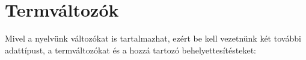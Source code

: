 \section{Termváltozók}

Mivel a nyelvünk változókat is tartalmazhat, ezért be kell vezetnünk két további adattípust, a termváltozókat és a hozzá tartozó behelyettesítésteket:
\begin{code}%
\>[0]\AgdaSpace{}%
\AgdaSpace{}%
\AgdaSymbol{:}\AgdaSpace{}%
\AgdaSpace{}%
\AgdaSpace{}%
\AgdaSpace{}%
\<%
\\
\>[0][@{}l@{\AgdaIndent{0}}]%
\>[2]\AgdaSpace{}%
\AgdaSymbol{:}\AgdaSpace{}%
\AgdaSymbol{\}}\AgdaSpace{}%
\AgdaSpace{}%
\AgdaSpace{}%
\AgdaSymbol{(}\AgdaSpace{}%
\AgdaSymbol{)}\<%
\\
%
\>[2]\AgdaSpace{}%
\AgdaSymbol{:}\AgdaSpace{}%
\AgdaSymbol{\}}\AgdaSpace{}%
\AgdaSpace{}%
\AgdaSpace{}%
\AgdaSpace{}%
\AgdaSpace{}%
\AgdaSpace{}%
\AgdaSymbol{(}\AgdaSpace{}%
\AgdaSymbol{)}\<%
\\
%
\\[\AgdaEmptyExtraSkip]%
\>[0]\AgdaSpace{}%
\AgdaSpace{}%
\AgdaSymbol{:}\AgdaSpace{}%
\AgdaSpace{}%
\AgdaSpace{}%
\AgdaSpace{}%
\AgdaSpace{}%
\AgdaSpace{}%
\<%
\\
\>[0][@{}l@{\AgdaIndent{0}}]%
\>[2]%
\>[8]\AgdaSymbol{:}\AgdaSpace{}%
\AgdaSymbol{\}}\AgdaSpace{}%
\AgdaSpace{}%
\AgdaSpace{}%
\AgdaSpace{}%
\<%
\\
%
\>[2]\AgdaSpace{}%
\AgdaSymbol{:}\AgdaSpace{}%
\AgdaSpace{}%
\AgdaSymbol{\}}\AgdaSpace{}%
\AgdaSpace{}%
\AgdaSpace{}%
\AgdaSpace{}%
\AgdaSpace{}%
\AgdaSpace{}%
\AgdaSpace{}%
\AgdaSpace{}%
\AgdaSpace{}%
\AgdaSpace{}%
\AgdaSpace{}%
\AgdaSymbol{(}\AgdaSpace{}%
\AgdaSymbol{)}\<%
\end{code}

